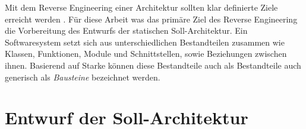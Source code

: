 Mit dem Reverse Engineering einer Architektur sollten klar definierte Ziele erreicht werden \autocite[vgl.][200]{Reussner2009}. 
Für diese Arbeit was das primäre Ziel des Reverse Engineering die Vorbereitung des Entwurfs der statischen Soll-Architektur. Ein Softwaresystem setzt sich aus unterschiedlichen Bestandteilen zusammen wie Klassen, Funktionen, Module und Schnittstellen, sowie Beziehungen zwischen ihnen. Basierend auf Starke \citeyear[S. 24]{Starke2011} können diese Bestandteile auch als Bestandteile auch generisch als \emph{Bausteine} bezeichnet werden.





\section{Entwurf der Soll-Architektur}

